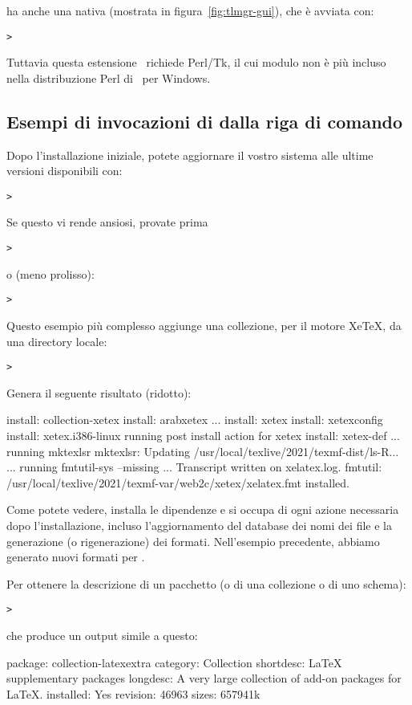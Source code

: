 \documentclass{article}
\begin{document}
 ha anche una \GUI{} nativa (mostrata in
figura~\ref{fig:tlmgr-gui}), che è avviata con:
\begin{alltt}
> 
\end{alltt}
Tuttavia questa estensione \GUI\ richiede Perl/Tk, il cui modulo non è più
incluso nella distribuzione Perl di \TL\ per Windows.

\subsection{Esempi di invocazioni di  dalla riga di comando}

Dopo l'installazione iniziale, potete aggiornare il vostro sistema alle
ultime versioni disponibili con:
\begin{alltt}
> 
\end{alltt}
Se questo vi rende ansiosi, provate prima
\begin{alltt}
> 
\end{alltt}
o (meno prolisso):
\begin{alltt}
> 
\end{alltt}

Questo esempio più complesso aggiunge una collezione, per il motore
Xe\TeX, da una directory locale:

\begin{alltt}
> 
\end{alltt}
Genera il seguente risultato (ridotto):
\begin{fverbatim}
install: collection-xetex
install: arabxetex
...
install: xetex
install: xetexconfig
install: xetex.i386-linux
running post install action for xetex
install: xetex-def
...
running mktexlsr
mktexlsr: Updating /usr/local/texlive/2021/texmf-dist/ls-R...
...
running fmtutil-sys --missing
...
Transcript written on xelatex.log.
fmtutil: /usr/local/texlive/2021/texmf-var/web2c/xetex/xelatex.fmt installed.
\end{fverbatim}

Come potete vedere,  installa le dipendenze e si occupa di ogni
azione necessaria dopo l'installazione, incluso l'aggiornamento del
database dei nomi dei file e la generazione (o rigenerazione) dei formati.
Nell'esempio precedente, abbiamo generato nuovi formati per \XeTeX.

Per ottenere la descrizione di un pacchetto (o di una collezione o di uno
schema):
\begin{alltt}
> 
\end{alltt}
che produce un output simile a questo:
\begin{fverbatim}
package:    collection-latexextra
category:   Collection
shortdesc:  LaTeX supplementary packages
longdesc:   A very large collection of add-on packages for LaTeX.
installed:  Yes
revision:   46963
sizes:      657941k
\end{fverbatim}
\end{document}
